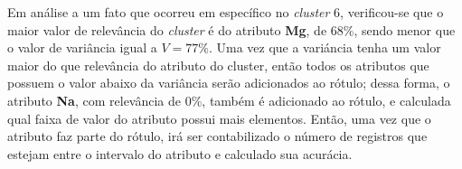 Em análise a um fato que ocorreu em específico no \textit{cluster} 6, verificou-se que o maior valor de relevância do \textit{cluster} é do atributo \textbf{Mg}, de 68\%, sendo menor que o valor de  variância igual a ${V=77\%}$. Uma vez que a variáncia tenha um valor maior do que relevância do atributo do cluster, então todos os atributos que possuem o valor abaixo da variância serão adicionados ao rótulo; dessa forma, o atributo \textbf{Na}, com relevância de 0\%, também é adicionado ao rótulo, e calculada qual faixa de valor do atributo possui mais elementos. Então, uma vez que o atributo faz parte do rótulo, irá ser contabilizado o número de registros que estejam entre o intervalo do atributo e calculado sua acurácia.
% 
% 
% 
